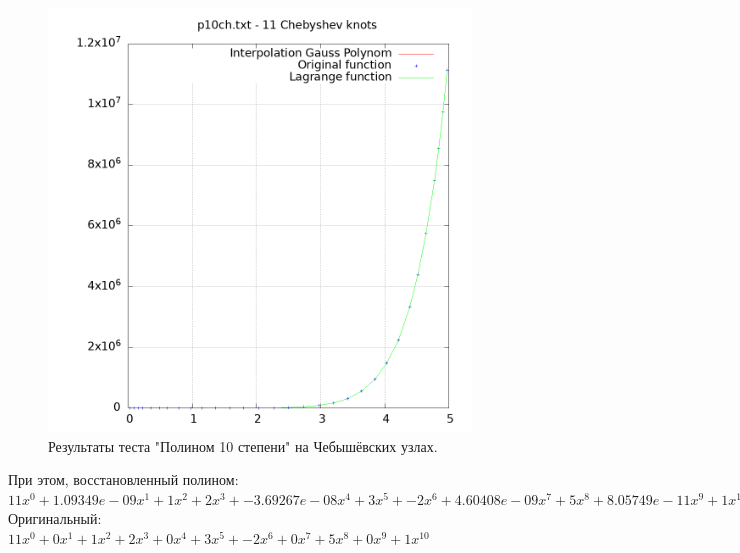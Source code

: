 \documentclass[14pt,a4paper]{extarticle}
\newcommand{\1}{\mathbbm{1}}
\begin{document}
    \begin{figure}
        \centering
        \includegraphics[scale=0.5]{Images/p10ch.txt.png}
        \caption{Результаты теста "Полином 10 степени" на Чебышёвских узлах.}
    \end{figure}
    При этом, восстановленный полином: \\
    $11x^0 + 1.09349e-09x^1 + 1x^2 + 2x^3 + -3.69267e-08x^4 + 3x^5 + -2x^6 + 4.60408e-09x^7 + 5x^8 + 8.05749e-11x^9 + 1x^10$ \\
    Оригинальный: \\
    $11x^0 + 0x^1 + 1x^2 + 2x^3 + 0x^4 + 3x^5 + -2x^6 + 0x^7 + 5x^8 + 0x^9 + 1x^10$
\end{document}
